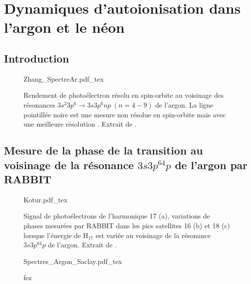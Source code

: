 \part{Dynamiques d'autoionisation dans l'argon et le néon}
\label{part:Argon}
\chapter*{Introduction}

\begin{figure}
\centering
\def\svgwidth{0.85\textwidth}
{Zhang_SpectreAr.pdf_tex}
\caption{Rendement de photoélectron résolu en spin-orbite au voisinage des résonances $3s^2 3p^6 \rightarrow 3s 3p^6 np \: (n = 4 - 9) $ de l'argon. La ligne pointillée noire est une mesure non résolue en spin-orbite mais avec une meilleure résolution . Extrait de .}
\label{fig:Zhang_SpectreAr}
\end{figure}

\chapter[Mesure de la phase de la transition au voisinage de la résonance $3s3p^64p$ de l'argon par RABBIT]{Mesure de la phase de la transition au voisinage de la résonance \MakeLowercase{$3s3p^64p$} de l'argon par RABBIT}

\begin{figure}
\centering
\def\svgwidth{0.5\textwidth}
{Kotur.pdf_tex}
\caption{Signal de photoélectrons de l'harmonique 17 (a), variations de phases mesurées par RABBIT dans les pics satellites 16 (b) et 18 (c) lorsque l'énergie de H$_{17}$ est variée au voisinage de la résonance $3s3p^64p$ de l'argon. Extrait de .}
\label{fig:Kotur}
\end{figure}

\begin{figure}
\centering
\def\svgwidth{1\textwidth}
{Spectres_Argon_Saclay.pdf_tex}
\caption{fez}
\label{fig:Spectres_Argon_Saclay}
\end{figure}

